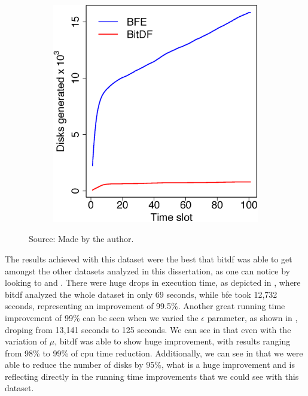 {\begin{figure}[h!]
\begin{subfigure}[t]{0.48\textwidth}
        \includegraphics[width=\textwidth]{images/Brinkhoff_d.eps}
        \label{fig:brinkhoff_disks}
    \end{subfigure}
    \footnotesize{Source: Made by the author.}
    \label{fig:brinkhoff_results2}
\end{figure}

The results achieved with this dataset were the best that \ac{bitdf} was able to get amongst the other datasets analyzed
in this dissertation, as one can notice by looking to  and
.  There were huge drops in execution time, as depicted in ,
where \ac{bitdf} analyzed the whole dataset in only 69 seconds, while \ac{bfe} took 12,732 seconds, representing an
improvement of 99.5\%. Another great running time improvement of 99\% can be seen when we varied the $\epsilon$
parameter, as shown in , droping from 13,141 seconds to 125 seconds. We can see in
 that even with the variation of $\mu$, \ac{bitdf} was able to show huge improvement, with
results ranging from 98\% to 99\% of \ac{cpu} time reduction.  Additionally, we can see in 
that we were able to reduce the number of disks by 95\%, what is a huge improvement and is reflecting directly in the
running time improvements that we could see with this dataset.

}
